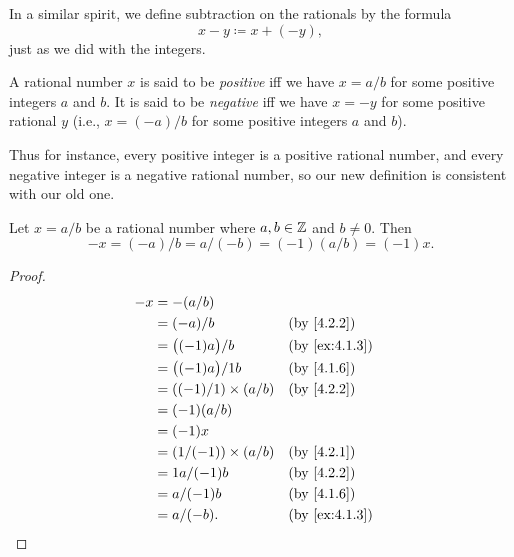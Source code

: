 \begin{note}
  In a similar spirit, we define subtraction on the rationals by the formula
  \[
    x - y \coloneqq x + (-y),
  \]
  just as we did with the integers.
\end{note}

\begin{defn}\label{4.2.6}
  A rational number \(x\) is said to be \emph{positive} iff we have \(x = a / b\) for some positive integers \(a\) and \(b\).
  It is said to be \emph{negative} iff we have \(x = -y\) for some positive rational \(y\)
  (i.e., \(x = (-a) / b\) for some positive integers \(a\) and \(b\)).
\end{defn}

\begin{note}
  Thus for instance, every positive integer is a positive rational number, and every negative integer is a negative rational number, so our new definition is consistent with our old one.
\end{note}

\begin{ac}\label{ac:4.2.3}
  Let \(x = a / b\) be a rational number where \(a, b \in \mathbb{Z}\) and \(b \neq 0\).
  Then
  \[
    -x = (-a) / b = a / (-b) = (-1)(a / b) = (-1)x.
  \]
\end{ac}

\begin{proof}
  \begin{align*}
    -x & = -(a / b)                                                   \\
       & = (-a) / b                  &  & \by{4.2.2}                  \\
       & = \big((-1)a\big) / b       &  & \text{(by \cref{ex:4.1.3})} \\
       & = \big((-1)a\big) / 1b      &  & \by{4.1.6}                  \\
       & = ((-1) / 1) \times (a / b) &  & \by{4.2.2}                  \\
       & = (-1)(a / b)                                                \\
       & = (-1)x                                                      \\
       & = (1 / (-1)) \times (a / b) &  & \by{4.2.1}                  \\
       & = 1a / (-1)b                &  & \by{4.2.2}                  \\
       & = a / (-1)b                 &  & \by{4.1.6}                  \\
       & = a / (-b).                 &  & \text{(by \cref{ex:4.1.3})}
  \end{align*}
\end{proof}

